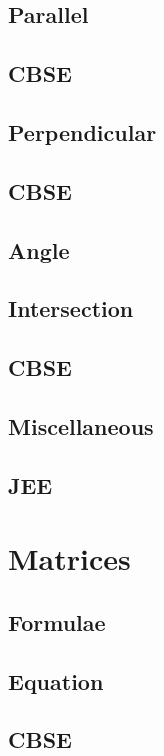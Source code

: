 \documentclass[journal]{IEEEtran}
\begin{document}
\subsection{Parallel}

\subsection{CBSE}

\subsection{Perpendicular}

\subsection{CBSE}

\subsection{Angle}

\subsection{Intersection}

\subsection{CBSE}

\subsection{Miscellaneous }

\subsection{JEE}

\newpage
\section{Matrices}
\subsection{Formulae}

\subsection{Equation}

\subsection{CBSE}

\end{document}

